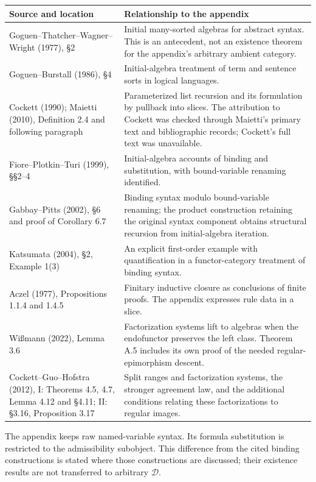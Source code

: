 \documentclass[10pt]{article}
\begin{document}
\begin{tabularx}{\textwidth}{@{}P{0.31\textwidth}Y@{}}
\toprule
Source and location & Relationship to the appendix\\\midrule
Goguen--Thatcher--Wagner--Wright (1977), \S2 & Initial many-sorted algebras
for abstract syntax. This is an antecedent, not an existence theorem for the
appendix's arbitrary ambient category.\\
Goguen--Burstall (1986), \S4 & Initial-algebra treatment of term and sentence
sorts in logical languages.\\
Cockett (1990); Maietti (2010), Definition 2.4 and following paragraph &
Parameterized list recursion and its formulation by pullback into slices.
The attribution to Cockett was checked through Maietti's primary text and
bibliographic records; Cockett's full text was unavailable.\\
Fiore--Plotkin--Turi (1999), \S\S2--4 & Initial-algebra accounts of binding
and substitution, with bound-variable renaming identified.\\
Gabbay--Pitts (2002), \S6 and proof of Corollary 6.7 & Binding syntax modulo
bound-variable renaming; the product construction retaining the original
syntax component obtains structural recursion from initial-algebra iteration.\\
Katsumata (2004), \S2, Example 1(3) & An explicit first-order example with
quantification in a functor-category treatment of binding syntax.\\
Aczel (1977), Propositions 1.1.4 and 1.4.5 & Finitary inductive closure as
conclusions of finite proofs. The appendix expresses rule data in a slice.\\
Wi\ss{}mann (2022), Lemma 3.6 & Factorization systems lift to algebras when
the endofunctor preserves the left class. Theorem A.5 includes its own proof
of the needed regular-epimorphism descent.\\
Cockett--Guo--Hofstra (2012), I: Theorems 4.5, 4.7, Lemma 4.12 and \S4.11;
II: \S3.16, Proposition 3.17 & Split ranges and factorization systems,
the stronger agreement law, and the additional conditions relating these
factorizations to regular images.\\\bottomrule
\end{tabularx}

The appendix keeps raw named-variable syntax. Its formula substitution is
restricted to the admissibility subobject. This difference from the cited
binding constructions is stated where those constructions are discussed;
their existence results are not transferred to arbitrary $\mathcal D$.
\end{document}
